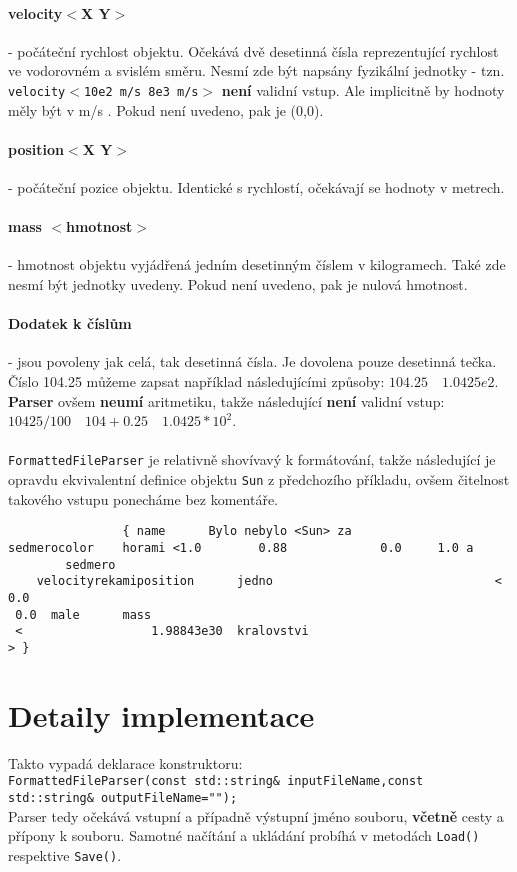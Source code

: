 \paragraph{velocity$ < $X Y$ > $} - počáteční rychlost objektu. Očekává dvě desetinná čísla reprezentující rychlost ve vodorovném a svislém směru. Nesmí zde být napsány fyzikální jednotky - tzn. \texttt{velocity$ < $10e2 m/s 8e3 m/s$ > $} \textbf{není} validní vstup. Ale implicitně by hodnoty měly být v m/s . Pokud není uvedeno, pak je (0,0).
\paragraph{position$ < $X Y$ > $} - počáteční pozice objektu. Identické s rychlostí, očekávají se hodnoty v metrech.
\paragraph{mass $ < $hmotnost$ > $ } - hmotnost objektu vyjádřená jedním desetinným číslem v kilogramech. Také zde nesmí být jednotky uvedeny. Pokud není uvedeno, pak je nulová hmotnost.
\paragraph{Dodatek k číslům} - jsou povoleny jak celá, tak desetinná čísla. Je dovolena pouze desetinná tečka. Číslo 104.25 můžeme zapsat například následujícími způsoby: $ 104.25 \quad 1.0425e2$.
\textbf{Parser} ovšem \textbf{neumí} aritmetiku, takže následující \textbf{není} validní vstup: $ 10425/100 \quad 104 + 0.25 \quad 1.0425 * 10^2 $.
\paragraph{}
\texttt{FormattedFileParser} je relativně shovívavý k formátování, takže následující je opravdu ekvivalentní definice objektu \texttt{Sun} z předchozího příkladu, ovšem čitelnost takového vstupu ponecháme bez komentáře. 
\begin{lstlisting}
				{ name		Bylo nebylo	<Sun> za 
sedmerocolor	horami <1.0 	   0.88 			0.0 	1.0 a
 		sedmero
	velocityrekamiposition		jedno								<
0.0 
 0.0  male 		mass	
 <					1.98843e30  kralovstvi
> }

\end{lstlisting}

\section{Detaily implementace}
Takto vypadá deklarace konstruktoru: \\
\lstinline|FormattedFileParser(const std::string& inputFileName,const std::string& outputFileName="");|\\
Parser tedy očekává vstupní a případně výstupní jméno souboru,\textbf{ včetně} cesty a přípony k souboru. Samotné načítání a ukládání probíhá v metodách \texttt{Load()} respektive \texttt{Save()}.

